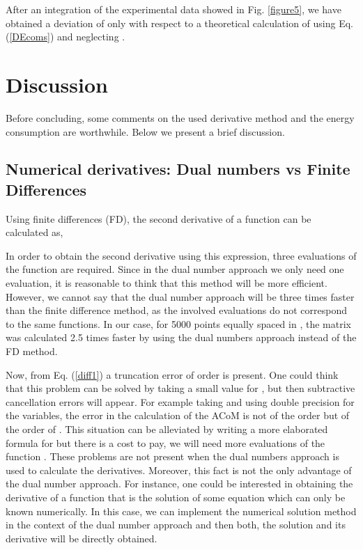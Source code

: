 \documentclass[11pt]{article}
\begin{document}
After an integration of the experimental data showed in Fig. 
\ref{figure5}, we have obtained a deviation of only  with respect
to a theoretical calculation of  using Eq. (\ref{DEcoms})
and neglecting .


\section{Discussion}\label{Discussion}
Before concluding, some comments on the used derivative method and the
energy consumption are worthwhile. Below we present a brief discussion.

\subsection*{Numerical derivatives: Dual numbers vs Finite Differences}
Using finite differences (FD), the second derivative of a function can 
be calculated as,

In order to obtain the second derivative using this expression, three 
evaluations of the function  are required. Since in the dual number 
approach we only need one evaluation, it is reasonable to think  that 
this method will be more efficient. However, we cannot say that the dual 
number approach will be three times faster than the finite difference 
method, as the involved evaluations do not correspond to the same 
functions.  In our case, for 5000 points equally spaced in , 
the matrix  was 
calculated 2.5 times faster by using the dual numbers approach instead 
of the FD method. 

Now, from Eq. (\ref{diff1}) a truncation error of order  is 
present. One could think that this problem can be solved by taking a 
small value for , but then subtractive cancellation errors will 
appear. For example taking  and using double 
precision for the variables, the error in the calculation of the ACoM is 
not of the order  but of the order of . This situation can 
be alleviated by writing a more elaborated formula for  but there 
is a cost to pay, we will need more evaluations of the function . 
These problems are not present when the dual numbers approach is used to 
calculate the derivatives. Moreover, this fact is not the only advantage 
of the dual number approach. For instance, one could be interested in 
obtaining the derivative of a function that is the solution of some 
equation which can only be known numerically. In this case, we can 
implement the numerical solution method in the context of the dual 
number approach and then both, the solution and its derivative will be 
directly obtained.
\end{document}
